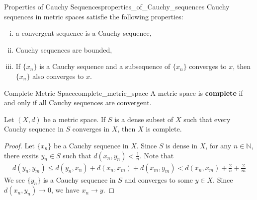 \documentclass{report}
\begin{document}
\begin{proposition}{Properties of Cauchy Sequences}{properties_of_Cauchy_sequences}
	Cauchy sequences in metric spaces satisfie the following properties:
	\begin{enumerate}[(i)]
		\item a convergent sequence is a Cauchy sequence,
		\item Cauchy sequences are bounded,
		\item If $\{x_n\}$ is a Cauchy sequence and a subsequence of $\{x_n\}$ converges to $x$, then $\{x_n\}$ also converges to $x$.
	\end{enumerate}
\end{proposition}

\begin{definition}{Complete Metric Space}{complete_metric_space}
	A metric space is \textbf{complete} if and only if all Cauchy sequences are convergent.
\end{definition}




\begin{lemma}{}{}
	Let $(X, d)$ be a metric space. If $S$ is a dense subset of $X$ such that every Cauchy sequence in $S$ converges in $X$, then $X$ is complete.
\end{lemma}
\begin{proof}
	Let $\{x_n\}$ be a Cauchy sequence in $X$. Since $S$ is dense in $X$, for any $n\in\mathbb{N}$, there exsits $y_n\in S$ such that $d(x_n,y_n)<\frac{1}{n}$. Note that
	\begin{align*}
		d(y_n,y_m)\le d(y_n,x_n)+d(x_n,x_m)+d(x_m,y_m)<d(x_n,x_m)+\frac{2}{n}+\frac{2}{m}
	\end{align*}
	We see $\{y_n\}$ is a Cauchy sequence in $S$ and converges to some $y\in X$. Since $d(x_n,y_n)\to 0$, we have $x_n\to y$.
\end{proof}
\end{document}

